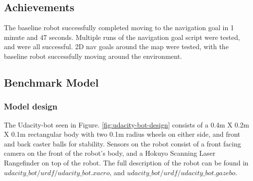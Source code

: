 \documentclass[10pt,journal,compsoc]{IEEEtran}
\begin{document}

\subsection{Achievements}
The baseline robot successfully completed moving to the navigation goal in 1 minute and 47 seconds. Multiple runs of the navigation goal script were tested, and were all successful. 2D nav goals around the map were tested, with the baseline robot successfully moving around the environment.

\subsection{Benchmark Model}
\subsubsection{Model design}

The Udacity-bot seen in Figure. \ref{fig:udacity-bot-design} consists of a 0.4m X 0.2m X 0.1m rectangular body with two 0.1m radius wheels on either side, and front and back caster balls for stability. Sensors on the robot consist of a front facing camera on the front of the robot's body, and a Hokuyo Scanning Laser Rangefinder on top of the robot. The full description of the robot can be found in \textit{$udacity\_bot/urdf/udacity\_bot.xacro$}, and \textit{$udacity\_bot/urdf/udacity\_bot.gazebo$}.
\end{document}
